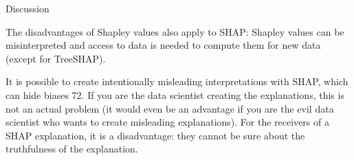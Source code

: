 \documentclass[10pt,compress,t,notes=noshow, xcolor=table]{beamer}
\begin{document}
\begin{vbframe}{Discussion}
\begin{onlyenv}
The disadvantages of Shapley values also apply to SHAP: Shapley values can be misinterpreted and access to data is needed to compute them for new data (except for TreeSHAP).

It is possible to create intentionally misleading interpretations with SHAP, which can hide biases 72. If you are the data scientist creating the explanations, this is not an actual problem (it would even be an advantage if you are the evil data scientist who wants to create misleading explanations). For the receivers of a SHAP explanation, it is a disadvantage: they cannot be sure about the truthfulness of the explanation.

\end{onlyenv}

\end{vbframe}

\endlecture
\end{document}
